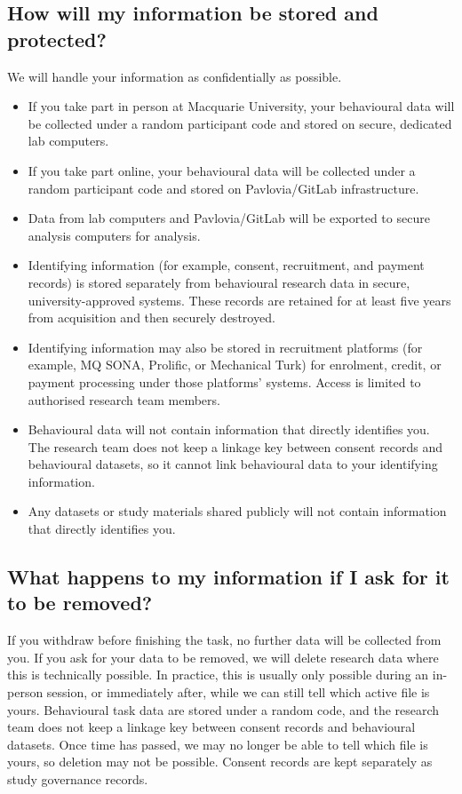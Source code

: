 \documentclass[letterpaper, 10pt]{article}
\let\oldsubsection\subsection
\renewcommand{\subsection}[1]{%
  \Needspace{10\baselineskip}%
  \oldsubsection{#1}%
}
\begin{document}
\subsection{How will my information be stored and protected?}
We will handle your information as confidentially as possible.

\begin{itemize}
\item If you take part in person at Macquarie University,
    your behavioural data will be collected under a random
    participant code and stored on secure, dedicated lab
    computers.

\item If you take part online, your behavioural data will be
    collected under a random participant code and stored on
    Pavlovia/GitLab infrastructure.

\item Data from lab computers and Pavlovia/GitLab will be
    exported to secure analysis computers for analysis.

\item Identifying information (for example, consent,
    recruitment, and payment records) is stored separately
    from behavioural research data in secure,
    university-approved systems. These records are retained
    for at least five years from acquisition and then
    securely destroyed.

\item Identifying information may also be stored in
    recruitment platforms (for example, MQ SONA, Prolific,
    or Mechanical Turk) for enrolment, credit, or payment
    processing under those platforms' systems. Access is
    limited to authorised research team members.

\item Behavioural data will not contain information that
    directly identifies you. The research team does not keep
    a linkage key between consent records and behavioural
    datasets, so it cannot link behavioural data to your
    identifying information.

\item Any datasets or study materials shared publicly will
    not contain information that directly identifies you.
\end{itemize}

\subsection{What happens to my information if I ask for it to be removed?}
If you withdraw before finishing the task, no further data
will be collected from you. If you ask for your data to be
removed, we will delete research data where this is
technically possible. In practice, this is usually only
possible during an in-person session, or immediately after,
while we can still tell which active file is yours.
Behavioural task data are stored under a random code, and
the research team does not keep a linkage key between
consent records and behavioural datasets. Once time has
passed, we may no longer be able to tell which file is
yours, so deletion may not be possible. Consent records are
kept separately as study governance records.
\end{document}
